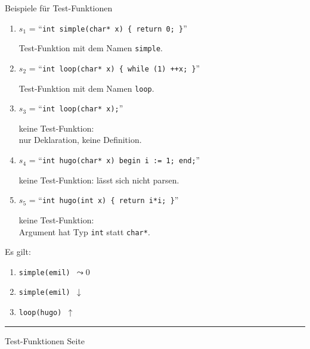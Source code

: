 \documentclass{slides}
\newcounter{mypage}
\begin{document}

\begin{slide}{}
\normalsize

\begin{center}
Beispiele f\"ur Test-Funktionen
\end{center}
\vspace*{0.5cm}

\footnotesize

\begin{enumerate}
\item $s_1$ = ``{\tt int simple(char* x) \{ return 0; \}}''

      Test-Funktion mit dem Namen \texttt{simple}.
\item $s_2$ = ``{\tt int loop(char* x) \{ while (1) ++x; \}}''

      Test-Funktion mit dem Namen \texttt{loop}. 
\item $s_3$ = ``{\tt int loop(char* x);}''

      keine Test-Funktion: \\[0.3cm]
      \hspace*{1.3cm}  nur Deklaration, keine Definition.
\item $s_4$ = ``{\tt int hugo(char* x) begin i := 1; end;}''

      keine Test-Funktion: l\"asst sich nicht parsen.
\item $s_5$ = ``{\tt int hugo(int x) \{ return i*i; \}}''

      keine Test-Funktion: \\[0.3cm]
      Argument hat Typ \texttt{int} statt \texttt{char*}.
\end{enumerate}

Es gilt:
\begin{enumerate}
\item {\tt simple(emil) $\leadsto 0$}
\item {\tt simple(emil) $\downarrow$}
\item {\tt loop(hugo) $\uparrow$}
\end{enumerate}


\vspace*{\fill}
\tiny \addtocounter{mypage}{1}
\rule{17cm}{1mm}
Test-Funktionen  \hspace*{\fill} Seite 
\end{slide}

\end{document}
